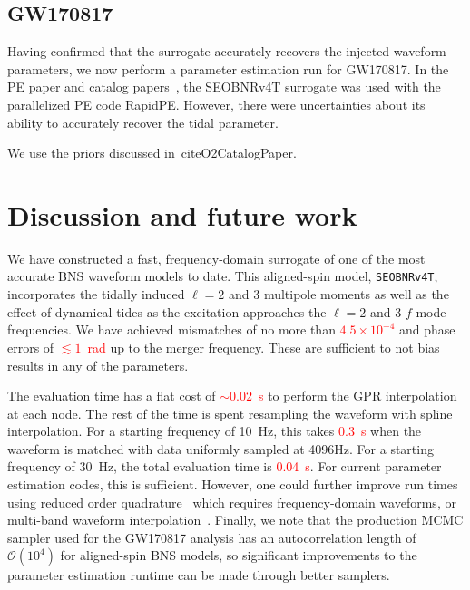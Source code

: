 \documentclass[prd,aps,letter,twocolumn,floatfix,notitlepage,nofootinbib]{revtex4-1}
\newcommand{\red}[1]{\textcolor{red}{#1}}
\begin{document}
\subsection{GW170817}

Having confirmed that the surrogate accurately recovers the injected waveform parameters, we now perform a parameter estimation run for GW170817. In the PE paper and catalog papers~\cite{}, the SEOBNRv4T surrogate was used with the parallelized PE code RapidPE. However, there were uncertainties about its ability to accurately recover the tidal parameter.

We use the priors discussed in~cite{O2CatalogPaper}. 

\section{Discussion and future work}

We have constructed a fast, frequency-domain surrogate of one of the most accurate BNS waveform models to date. This aligned-spin model, \texttt{SEOBNRv4T}, incorporates the tidally induced $\ell=2$ and 3 multipole moments as well as the effect of dynamical tides as the excitation approaches the $\ell=2$ and 3 $f$-mode frequencies. We have achieved mismatches of no more than \red{$4.5 \times 10^{-4}$} and phase errors of \red{$\lesssim 1$~rad} up to the merger frequency. These are sufficient to not bias results in any of the parameters.

The evaluation time has a flat cost of \red{$\sim 0.02$~s} to perform the GPR interpolation at each node. The rest of the time is spent resampling the waveform with spline interpolation. For a starting frequency of 10~Hz, this takes \red{0.3~s} when the waveform is matched with data uniformly sampled at 4096Hz. For a starting frequency of 30~Hz, the total evaluation time is \red{0.04~s}. For current parameter estimation codes, this is sufficient. However, one could further improve run times using reduced order quadrature~\cite{Antil2013, CanizaresFieldGair2013, CanizaresFieldGair2015, Smith:2016qas} which requires frequency-domain waveforms, or multi-band waveform interpolation~\cite{VinciguerraVeitchMandel2017}. Finally, we note that the production MCMC sampler used for the GW170817 analysis has an autocorrelation length of $\mathcal{O}(10^4)$ for aligned-spin BNS models, so significant improvements to the parameter estimation runtime can be made through better samplers. 
\end{document}
